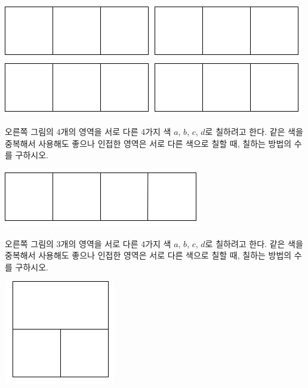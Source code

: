\documentclass[a4paper]{oblivoir}
\begin{document}
\includegraphics[width=.2\textwidth]{2}\quad
\includegraphics[width=.2\textwidth]{2}\quad
\includegraphics[width=.2\textwidth]{2}\quad
\includegraphics[width=.2\textwidth]{2}\\[5pt]


%
\begin{minipage}{.65\textwidth}
\begin{Exercise}
오른쪽 그림의 4개의 영역을 서로 다른 4가지 색 \(a\), \(b\), \(c\), \(d\)로 칠하려고 한다.
같은 색을 중복해서 사용해도 좋으나 인접한 영역은 서로 다른 색으로 칠할 때, 칠하는 방법의 수를 구하시오.
\end{Exercise}
\end{minipage}
\quad
\begin{minipage}{.25\textwidth}
\includegraphics[width=.5\textwidth]{3}
\end{minipage}


%
\begin{minipage}{.65\textwidth}
\begin{Exercise}
오른쪽 그림의 3개의 영역을 서로 다른 4가지 색 \(a\), \(b\), \(c\), \(d\)로 칠하려고 한다.
같은 색을 중복해서 사용해도 좋으나 인접한 영역은 서로 다른 색으로 칠할 때, 칠하는 방법의 수를 구하시오.
\end{Exercise}
\end{minipage}
\quad
\begin{minipage}{.25\textwidth}
\includegraphics[width=.5\textwidth]{4}
\end{minipage}
\end{document}
